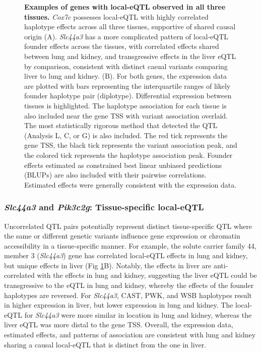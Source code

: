 \documentclass[10pt,letterpaper]{article}
\begin{document}
\begin{figure}[h!]
\caption{\textbf{Examples of genes with local-eQTL observed in all three tissues.} 
\textit{Cox7c} possesses local-eQTL with highly correlated haplotype effects across all three tissues, supportive of shared causal origin (A). \textit{Slc44a3} has a more complicated pattern of local-eQTL founder effects across the tissues, with correlated effects shared between lung and kidney, and transgressive effects in the liver eQTL by comparison, consistent with distinct casual variants comparing liver to lung and kidney. (B). For both genes, the expression data are plotted with bars representing the interquartile ranges of likely founder haplotype pair (diplotype). Differential expression between tissues is highlighted. The haplotype association for each tissue is also included near the gene TSS with variant association overlaid. The most statistically rigorous method that detected the QTL (Analysis L, C, or G) is also included. The red tick represents the gene TSS, the black tick represents the variant association peak, and the colored tick represents the haplotype association peak. Founder effects estimated as constrained best linear unbiased predictions (BLUPs) are also included with their pairwise correlations. Estimated effects were generally consistent with the expression data.
\label{fig:correlated_local_eqtl}}
\end{figure}

\subsubsection*{\textit{Slc44a3} and \textit{Pik3c2g}: Tissue-specific local-eQTL}
Uncorrelated QTL pairs potentially represent distinct tissue-specific QTL where the same or different genetic variants influence gene expression or chromatin accessibility in a tissue-specific manner. For example, the solute carrier family 44, member 3 (\textit{Slc44a3}) gene has correlated local-eQTL effects in lung and kidney, but unique effects in liver (Fig \ref{fig:correlated_local_eqtl}B). Notably, the effects in liver are anti-correlated with the effects in lung and kidney, suggesting the liver eQTL could be transgressive \cite{Rieseberg1999} to the eQTL in lung and kidney, whereby the effects of the founder haplotypes are reversed. For \textit{Slc44a3}, CAST, PWK, and WSB haplotypes result in higher expression in liver, but lower expression in lung and kidney. 
The local-eQTL for \textit{Slc44a3} were more similar in location in lung and kidney, whereas the liver eQTL was more distal to the gene TSS. Overall, the expression data, estimated effects, and patterns of association are consistent with lung and kidney sharing a causal local-eQTL that is distinct from the one in liver. 
\end{document}
